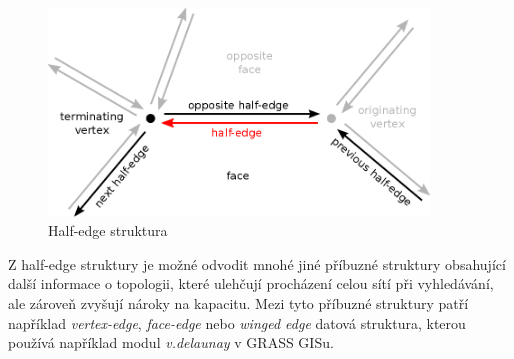 \documentclass[12pt,a4paper]{article}
\begin{document}
\begin{figure}[h!]
\centering
\includegraphics[width=0.9\textwidth]{../img/half_edge.png}
\caption{Half-edge struktura}
\label{fig:half_edge}
\end{figure}

Z half-edge struktury je možné odvodit mnohé jiné příbuzné struktury obsahující další informace o topologii, které ulehčují procházení celou sítí při vyhledávání, ale zároveň zvyšují nároky na kapacitu. Mezi tyto příbuzné struktury patří například \textit{vertex-edge}, \textit{face-edge} nebo \textit{winged edge} datová struktura, kterou používá například modul \textit{v.delaunay} v GRASS GISu.
\end{document}
